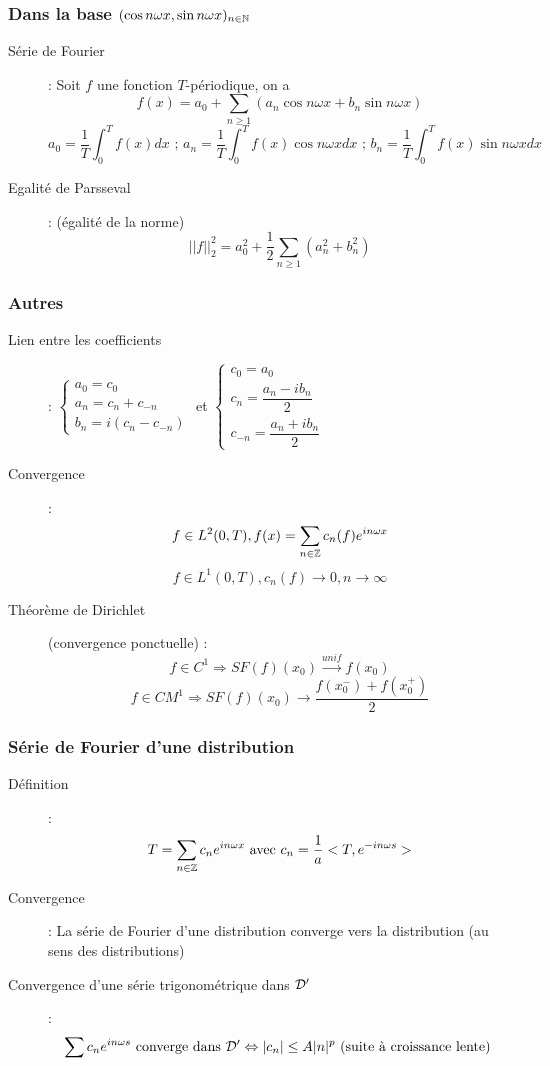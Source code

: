 \subsubsection{Dans la base $(\cos n\omega x, \sin n\omega x)_{n\in\mathbb{N}}$}
\begin{description}
\item[Série de Fourier] : Soit $f$ une fonction $T$-périodique, on a
    \[ f(x)=a_0+\sum_{n\ge 1}(a_n\cos n\omega x+b_n\sin n\omega x) \]
    \[
        a_0 = \frac{1}{T}\int_0^Tf(x)dx\textrm{ ; }
        a_n = \frac{1}{T}\int_0^Tf(x)\cos n\omega xdx\textrm{ ; }
        b_n = \frac{1}{T}\int_0^Tf(x)\sin n\omega xdx
    \]
\item[Egalité de Parsseval] : (égalité de la norme)
    \[
        ||f||_2^2=a_0^2+\frac{1}{2}\sum_{n\ge 1}(a_n^2+b_n^2)
    \]
\end{description}
\subsubsection{Autres}
\begin{description}
\item[Lien entre les coefficients] : 
    $\begin{cases}
        a_0=c_0\\
        a_n=c_n+c_{-n}\\
        b_n=i(c_n-c_{-n})
    \end{cases}$
    et
    $\begin{cases}
        c_0=a_0\\
        c_n=\dfrac{a_n-ib_n}{2}\\
        c_{-n}=\dfrac{a_n+ib_n}{2}
    \end{cases}$
\item[Convergence] :
    \[
        f\in L^2(0,T), f(x)=\sum_{n\in\mathbb{Z}}c_n(f)e^{in\omega x}
    \]
    \[
        f\in L^1(0,T), c_n(f)\longrightarrow 0, n\longrightarrow\infty
    \]
\item[Théorème de Dirichlet] (convergence ponctuelle) :
    \[
        f\in C^1\Rightarrow SF(f)(x_0)\overset{unif}{\longrightarrow}f(x_0)
    \]
    \[
        f\in CM^1\Rightarrow SF(f)(x_0)\longrightarrow\frac{f(x_0^-)+f(x_0^+)}{2}
    \]
\end{description}
\subsubsection{Série de Fourier d’une distribution}
\begin{description}
\item[Définition] : 
    \[
        T=\sum_{n\in\mathbb{Z}}c_ne^{in\omega x}
        \textrm{ avec }
        c_n=\frac{1}{a}<T,e^{-in\omega s}>
    \]
\item[Convergence] : La série de Fourier d’une distribution converge vers la distribution (au sens des distributions)
\item[Convergence d’une série trigonométrique dans $\mathcal{D}'$] :
    \[
        \sum c_ne^{in\omega s}\textrm{ converge dans }\mathcal{D}'
        \Leftrightarrow
        |c_n|\le A|n|^p
        \textrm{ (suite à croissance lente) }
    \]
\end{description}